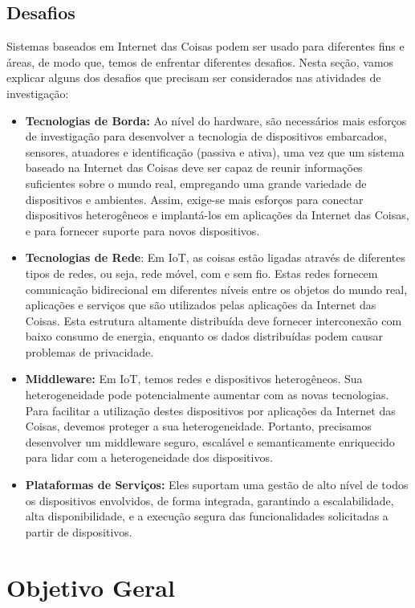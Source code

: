 \subsection{Desafios}

Sistemas baseados em Internet das Coisas podem ser usado para diferentes
fins e áreas, de modo que, temos de enfrentar diferentes desafios.
Nesta seção, vamos explicar alguns dos desafios que precisam ser considerados
nas atividades de investigação:
\begin{itemize}
\item \textbf{Tecnologias de Borda:} Ao nível do hardware, são necessários
mais esforços de investigação para desenvolver a tecnologia de dispositivos
embarcados, sensores, atuadores e identificação (passiva e ativa),
uma vez que um sistema baseado na Internet das Coisas deve ser capaz
de reunir informações suficientes sobre o mundo real, empregando uma
grande variedade de dispositivos e ambientes. Assim, exige-se mais
esforços para conectar dispositivos heterogêneos e implantá-los em
aplicações da Internet das Coisas, e para fornecer suporte para novos
dispositivos.
\item \textbf{Tecnologias de Rede}: Em IoT, as coisas estão ligadas através
de diferentes tipos de redes, ou seja, rede móvel, com e sem fio.
Estas redes fornecem comunicação bidirecional em diferentes níveis
entre os objetos do mundo real, aplicações e serviços que são utilizados
pelas aplicações da Internet das Coisas. Esta estrutura altamente
distribuída deve fornecer interconexão com baixo consumo de energia,
enquanto os dados distribuídas podem causar problemas de privacidade.
\item \textbf{Middleware:} Em IoT, temos redes e dispositivos heterogêneos.
Sua heterogeneidade pode potencialmente aumentar com as novas tecnologias.
Para facilitar a utilização destes dispositivos por aplicações da
Internet das Coisas, devemos proteger a sua heterogeneidade. Portanto,
precisamos desenvolver um middleware seguro, escalável e semanticamente
enriquecido para lidar com a heterogeneidade dos dispositivos.
\item \textbf{Plataformas de Serviços:} Eles suportam uma gestão de alto
nível de todos os dispositivos envolvidos, de forma integrada, garantindo
a escalabilidade, alta disponibilidade, e a execução segura das funcionalidades
solicitadas a partir de dispositivos.
\end{itemize}

\section{Objetivo Geral\label{sec:Objetivos}}

